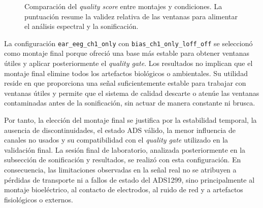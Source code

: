 \begin{figure}[!htbp]
    \centering
    \caption{Comparación del \textit{quality score} entre montajes y condiciones. La puntuación resume la validez relativa de las ventanas para alimentar el análisis espectral y la sonificación.}
    \label{fig:validacion_montaje_quality_score}
\end{figure}

La configuración \texttt{ear\_eeg\_ch1\_only} con \texttt{bias\_ch1\_only\_loff\_off} se seleccionó como montaje final porque ofreció una base más estable para obtener ventanas útiles y aplicar posteriormente el \textit{quality gate}. Los resultados no implican que el montaje final elimine todos los artefactos biológicos o ambientales. Su utilidad reside en que proporciona una señal suficientemente estable para trabajar con ventanas útiles y permite que el sistema de calidad descarte o atenúe las ventanas contaminadas antes de la sonificación, sin actuar de manera constante ni brusca.

Por tanto, la elección del montaje final se justifica por la estabilidad temporal, la ausencia de discontinuidades, el estado ADS válido, la menor influencia de canales no usados y su compatibilidad con el \textit{quality gate} utilizado en la validación final. La sesión final de laboratorio, analizada posteriormente en la subsección de sonificación y resultados, se realizó con esta configuración. En consecuencia, las limitaciones observadas en la señal real no se atribuyen a pérdidas de transporte ni a fallos de estado del ADS1299, sino principalmente al montaje bioeléctrico, al contacto de electrodos, al ruido de red y a artefactos fisiológicos o externos.
